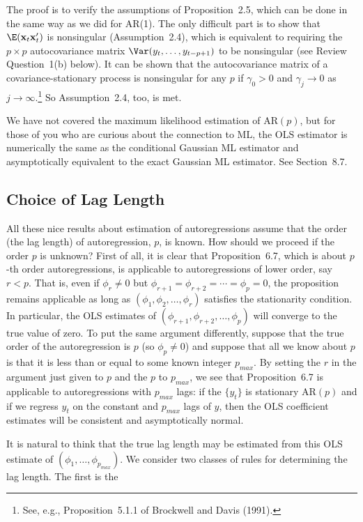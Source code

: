 The proof is to verify the assumptions of Proposition~2.5, which can be done in the
same way as we did for AR(1). The only difficult part is to show that $\E(\mathbf{x}_t \mathbf{x}_t')$ is
nonsingular (Assumption~2.4), which is equivalent to requiring the $p \times p$ autocovariance
matrix $\Var(y_t, \ldots, y_{t-p+1})$ to be nonsingular (see Review Question~1(b)
below). It can be shown that the autocovariance matrix of a covariance-stationary
process is nonsingular for any $p$ if $\gamma_0 > 0$ and $\gamma_j \to 0$ as $j \to \infty$.\footnote{See, e.g., Proposition~5.1.1 of Brockwell and Davis (1991).}
So Assumption~2.4, too, is met.

We have not covered the maximum likelihood estimation of $\text{AR}(p)$, but for
those of you who are curious about the connection to ML, the OLS estimator is
numerically the same as the conditional Gaussian ML estimator and asymptotically
equivalent to the exact Gaussian ML estimator. See Section~8.7.

\subsection*{Choice of Lag Length}

All these nice results about estimation of autoregressions assume that the order
(the lag length) of autoregression, $p$, is known. How should we proceed if the
order $p$ is unknown? First of all, it is clear that Proposition~6.7, which is about
$p$-th order autoregressions, is applicable to autoregressions of lower order, say
$r < p$. That is, even if $\phi_r \neq 0$ but $\phi_{r+1} = \phi_{r+2} = \cdots = \phi_p = 0$, the proposition
remains applicable as long as $(\phi_1, \phi_2, \ldots, \phi_r)$ satisfies the stationarity condition.
In particular, the OLS estimates of $(\phi_{r+1}, \phi_{r+2}, \ldots, \phi_p)$ will converge to the true
value of zero. To put the same argument differently, suppose that the true order of
the autoregression is $p$ (so $\phi_p \neq 0$) and suppose that all we know about $p$ is that it
is less than or equal to some known integer $p_{max}$. By setting the $r$ in the argument
just given to $p$ and the $p$ to $p_{max}$, we see that Proposition~6.7 is applicable to
autoregressions with $p_{max}$ lags: if the $\{y_t\}$ is stationary $\text{AR}(p)$ and if we regress
$y_t$ on the constant and $p_{max}$ lags of $y$, then the OLS coefficient estimates will be
consistent and asymptotically normal.

It is natural to think that the true lag length may be estimated from this OLS
estimate of $(\phi_1, \ldots, \phi_{p_{max}})$. We consider two classes of rules for determining the
lag length. The first is the

